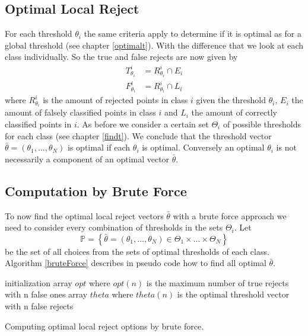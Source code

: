 \subsection{Optimal Local Reject}
For each threshold $\theta_i$ the same criteria apply to determine if it is optimal as for a global threshold (see chapter \ref{optimalt}). With the difference that we look at each class individually. So the true and false rejects are now given by
\begin{align} 
T_{\theta_i}^i &= R_{\theta_i}^i \cap E_i \\ 
F_{\theta_i}^i &= R_{\theta_i}^i \cap L_i
\end{align}
where $R_{\theta_i}^i$ is the amount of rejected points in class $i$ given the threshold $\theta_i$, $E_i$ the amount of falsely classified points in class $i$ and $L_i$ the amount of correctly classified points in $i$. As before we consider a certain set $\Theta_i$ of possible thresholds for each class (see chapter \ref{findt}). We conclude that the threshold vector $\bar{\theta}=(\theta_1,...,\theta_N)$ is optimal if each $\theta_i$ is optimal. Conversely an optimal $\theta_i$ is not necessarily a component of an optimal vector $\bar{\theta}$.


\subsection{Computation by Brute Force}
To now find the optimal local reject vectors $\bar{\theta}$ with a brute force approach we need to consider every combination of thresholds in the sets $\Theta_i$. Let
$$ \mathbb{P} = \left\{\bar{\theta} = \left(\theta_1,...,\theta_N\right) \in \Theta_1 \times ... \times \Theta_N \right\} $$
be the set of all choices from the sets of optimal thresholds of each class. Algorithm \ref{bruteForce} describes in pseudo code how to find all optimal $\bar{\theta}$.

\begin{algorithm}[!htbp]
 initialization\;
 array $opt$ where $opt(n)$ is the maximum number of true rejects with n false ones \;
 array $theta$ where $theta(n)$ is the optimal threshold vector with n false rejects \; 
 \BlankLine \BlankLine
 \caption{Computing optimal local reject options by brute force.}
 \label{bruteForce}
\end{algorithm}

